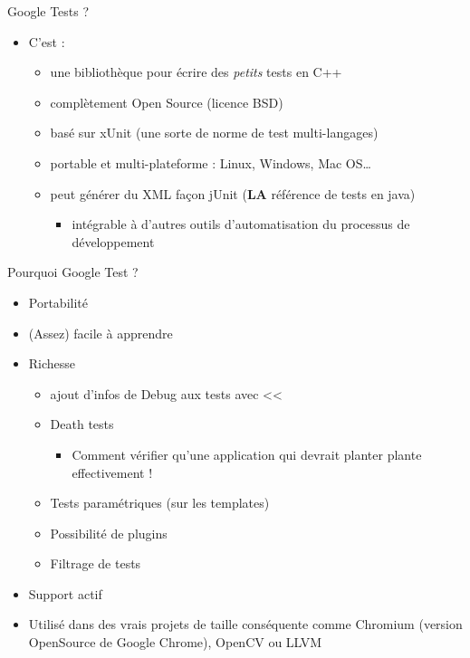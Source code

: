 \begin{frame}{Google Tests ?}

\begin{itemize}
\itemsep1pt\parskip0pt
\item
  C'est :

  \begin{itemize}
  \itemsep1pt\parskip0pt
  \item
    une bibliothèque pour écrire des \emph{petits} tests en C++
  \item
    complètement Open Source (licence BSD)
  \item
    basé sur xUnit (une sorte de norme de test multi-langages)
  \item
    portable et multi-plateforme : Linux, Windows, Mac OS\ldots{}
  \item
    peut générer du XML façon jUnit (\textbf{LA} référence de tests en
    java)

    \begin{itemize}
    \itemsep1pt\parskip0pt
    \item
      intégrable à d'autres outils d'automatisation du processus de
      développement
    \end{itemize}
  \end{itemize}
\end{itemize}

\end{frame}

\begin{frame}{Pourquoi Google Test ?}

\begin{itemize}
\itemsep1pt\parskip0pt
\item
  Portabilité
\item
  (Assez) facile à apprendre
\item
  Richesse

  \begin{itemize}
  \itemsep1pt\parskip0pt
  \item
    ajout d'infos de Debug aux tests avec \textless{}\textless{}
  \item
    Death tests

    \begin{itemize}
    \itemsep1pt\parskip0pt
    \item
      Comment vérifier qu'une application qui devrait planter plante
      effectivement !
    \end{itemize}
  \item
    Tests paramétriques (sur les templates)
  \item
    Possibilité de plugins
  \item
    Filtrage de tests
  \end{itemize}
\item
  Support actif
\item
  Utilisé dans des vrais projets de taille conséquente comme Chromium
  (version OpenSource de Google Chrome), OpenCV ou LLVM
\end{itemize}

\end{frame}

